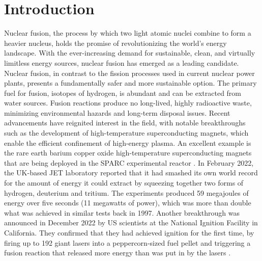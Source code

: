 \chapter{Introduction}
Nuclear fusion, the process by which two light atomic nuclei combine to form a heavier nucleus, holds the promise of revolutionizing the world's energy landscape. With the ever-increasing demand for sustainable, clean, and virtually limitless energy sources, nuclear fusion has emerged as a leading candidate. Nuclear fusion, in contrast to the fission processes used in current nuclear power plants, presents a fundamentally safer and more sustainable option. The primary fuel for fusion, isotopes of hydrogen, is abundant and can be extracted from water sources. Fusion reactions produce no long-lived, highly radioactive waste, minimizing environmental hazards and long-term disposal issues. Recent advancements have reignited interest in the field, with notable breakthroughs such as the development of high-temperature superconducting magnets, which enable the efficient confinement of high-energy plasma. An excellent example is the rare earth barium copper oxide high-temperature superconducting magnets that are being deployed in the SPARC experimental reactor \cite{SPARCoverview}. In February 2022, the UK-based JET laboratory reported that it had smashed its own world record for the amount of energy it could extract by squeezing together two forms of hydrogen, deuterium and tritium. The experiments produced 59 megajoules of energy over five seconds (11 megawatts of power), which was more than double what was achieved in similar tests back in 1997. Another breakthrough was announced in December 2022 by US scientists at the National Ignition Facility in California. They confirmed that they had achieved ignition for the first time, by firing up to 192 giant lasers into a peppercorn-sized fuel pellet and triggering a fusion reaction that released more energy than was put in by the lasers \cite{nationalignitionfacilitycali}.

